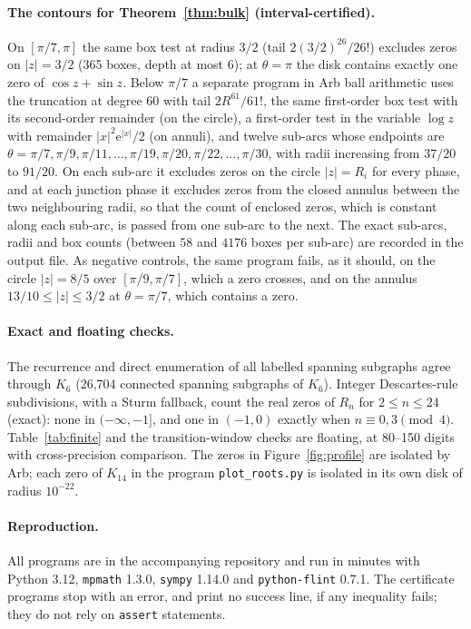 \documentclass[11pt,a4paper]{article}
\theoremstyle{remark}
\newcommand{\e}{\mathrm e}
\begin{document}
\paragraph{The contours for Theorem~\ref{thm:bulk} (interval-certified).} On $[\pi/7,\pi]$ the same box test at radius $3/2$ (tail $2(3/2)^{26}/26!$) excludes zeros on $|z|=3/2$ (365 boxes, depth at most 6); at $\theta=\pi$ the disk contains exactly one zero of $\cos z+\sin z$. Below $\pi/7$ a separate program in Arb ball arithmetic \cite{Arb} uses the truncation at degree $60$ with tail $2R^{61}/61!$, the same first-order box test with its second-order remainder (on the circle), a first-order test in the variable $\log z$ with remainder $|x|^2\e^{|x|}/2$ (on annuli), and twelve sub-arcs whose endpoints are $\theta=\pi/7,\pi/9,\pi/11,\ldots,\pi/19,\pi/20,\pi/22,\ldots,\pi/30$, with radii increasing from $37/20$ to $91/20$. On each sub-arc it excludes zeros on the circle $|z|=R_i$ for every phase, and at each junction phase it excludes zeros from the closed annulus between the two neighbouring radii, so that the count of enclosed zeros, which is constant along each sub-arc, is passed from one sub-arc to the next. The exact sub-arcs, radii and box counts (between $58$ and $4176$ boxes per sub-arc) are recorded in the output file. As negative controls, the same program fails, as it should, on the circle $|z|=8/5$ over $[\pi/9,\pi/7]$, which a zero crosses, and on the annulus $13/10\le|z|\le3/2$ at $\theta=\pi/7$, which contains a zero.

\paragraph{Exact and floating checks.} The recurrence and direct enumeration of all labelled spanning subgraphs agree through $K_6$ (26{,}704 connected spanning subgraphs of $K_6$). Integer Descartes-rule subdivisions, with a Sturm fallback, count the real zeros of $R_n$ for $2\le n\le24$ (exact): none in $(-\infty,-1]$, and one in $(-1,0)$ exactly when $n\equiv0,3\pmod4$. Table~\ref{tab:finite} and the transition-window checks are floating, at 80--150 digits with cross-precision comparison. The zeros in Figure~\ref{fig:profile} are isolated by Arb; each zero of $K_{14}$ in the program \texttt{plot\_roots.py} is isolated in its own disk of radius $10^{-22}$.

\paragraph{Reproduction.} All programs are in the accompanying repository and run in minutes with Python 3.12, \texttt{mpmath} 1.3.0, \texttt{sympy} 1.14.0 and \texttt{python-flint} 0.7.1. The certificate programs stop with an error, and print no success line, if any inequality fails; they do not rely on \texttt{assert} statements.
\end{document}
